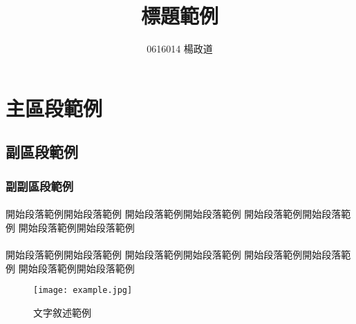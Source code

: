 \title{標題範例}
\author{0616014 楊政道}
\maketitle
\thispagestyle{fancy}
\section{主區段範例}
\subsection{副區段範例}
\subsubsection{副副區段範例}
\paragraph{}
開始段落範例開始段落範例
開始段落範例開始段落範例
開始段落範例開始段落範例
開始段落範例開始段落範例

\paragraph{}
開始段落範例開始段落範例
開始段落範例開始段落範例
開始段落範例開始段落範例
開始段落範例開始段落範例

\begin{figure}[!h]
\begin{center} 
\texttt{[image: example.jpg]} 
\caption{文字敘述範例}
\end{center} 
\end{figure} 
